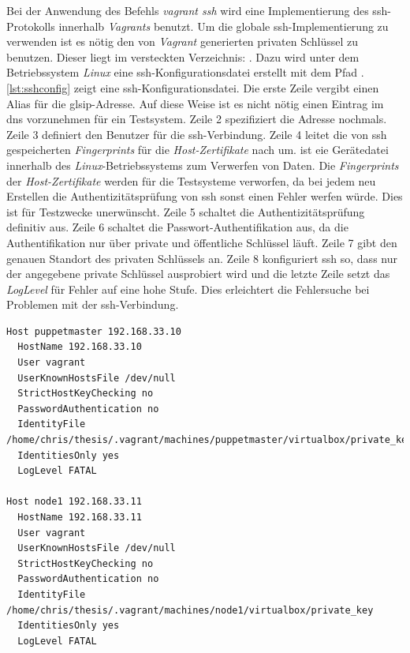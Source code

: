 \documentclass[titlepage]{report}
\begin{document}
Bei der Anwendung des Befehls \emph{vagrant ssh} wird eine
Implementierung des \gls{ssh}\hyp{}Protokolls innerhalb \emph{Vagrants} benutzt. Um
die globale \gls{ssh}\hyp{}Implementierung zu verwenden ist es nötig den
von \emph{Vagrant} generierten privaten Schlüssel zu benutzen. Dieser
liegt im versteckten Verzeichnis: . Dazu wird unter dem Betriebssystem
\emph{Linux} eine \gls{ssh}\hyp{}Konfigurationsdatei erstellt mit dem Pfad
. \autoref{lst:sshconfig} zeigt
eine \gls{ssh}\hyp{}Konfigurationsdatei. Die erste Zeile vergibt einen
Alias für die gls{ip}\hyp{}Adresse. Auf diese Weise ist es nicht nötig
einen Eintrag im \gls{dns} vorzunehmen für ein Testsystem. Zeile 2
spezifiziert die Adresse nochmals. Zeile 3 definiert den Benutzer für
die \gls{ssh}\hyp{}Verbindung. Zeile 4 leitet die von \gls{ssh}
gespeicherten \emph{Fingerprints} für die \emph{Host-Zertifikate} nach
 um.  ist eie Gerätedatei innerhalb des
\emph{Linux}\hyp{}Betriebssystems zum Verwerfen von Daten\cite{DEVNULL}. Die
\emph{Fingerprints} der \emph{Host-Zertifikate} werden für die
Testsysteme verworfen, da bei jedem neu Erstellen die
Authentizitätsprüfung von \gls{ssh} sonst einen Fehler werfen würde.
Dies ist für Testzwecke unerwünscht. Zeile 5 schaltet die
Authentizitätsprüfung definitiv aus. Zeile 6 schaltet die
Passwort\hyp{}Authentifikation aus, da die Authentifikation nur über
private und öffentliche Schlüssel läuft. Zeile 7 gibt den
genauen Standort des privaten Schlüssels an. Zeile 8 konfiguriert
\gls{ssh} so, dass nur der angegebene private Schlüssel ausprobiert
wird und die letzte Zeile setzt das \emph{LogLevel} für Fehler auf eine
hohe Stufe. Dies erleichtert die Fehlersuche bei Problemen mit der
\gls{ssh}\hyp{}Verbindung.
\begin{minipage}{\linewidth}
\begin{lstlisting}[caption={Beispiel einer SSH Konfigurationsdatei},label={lst:sshconfig}]
Host puppetmaster 192.168.33.10
  HostName 192.168.33.10
  User vagrant
  UserKnownHostsFile /dev/null
  StrictHostKeyChecking no
  PasswordAuthentication no
  IdentityFile /home/chris/thesis/.vagrant/machines/puppetmaster/virtualbox/private_key
  IdentitiesOnly yes
  LogLevel FATAL

Host node1 192.168.33.11
  HostName 192.168.33.11
  User vagrant
  UserKnownHostsFile /dev/null
  StrictHostKeyChecking no
  PasswordAuthentication no
  IdentityFile /home/chris/thesis/.vagrant/machines/node1/virtualbox/private_key
  IdentitiesOnly yes
  LogLevel FATAL
\end{lstlisting}
\end{minipage}
\end{document}
